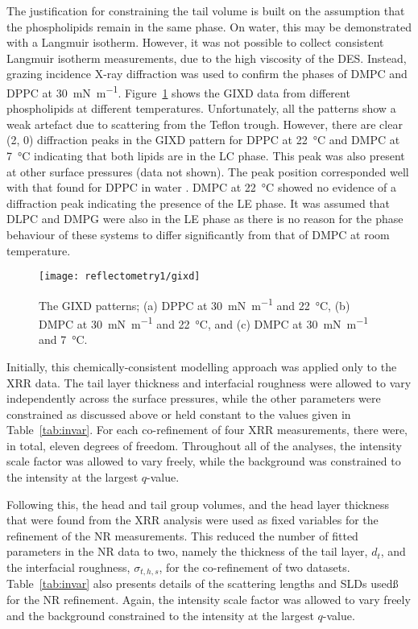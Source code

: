 The justification for constraining the tail volume is built on the assumption that the phospholipids remain in the same phase.
On water, this may be demonstrated with a Langmuir isotherm.
However, it was not possible to collect consistent Langmuir isotherm measurements, due to the high viscosity of the DES.
Instead, grazing incidence X-ray diffraction was used to confirm the phases of DMPC and DPPC at \SI{30}{\milli\newton\per\meter}.
Figure~\ref{fig:gixd} shows the GIXD data from different phospholipids at different temperatures.
Unfortunately, all the patterns show a weak artefact due to scattering from the Teflon trough.
However, there are clear (2, 0) diffraction peaks in the GIXD pattern for DPPC at \SI{22}{\celsius} and DMPC at \SI{7}{\celsius} indicating that both lipids are in the LC phase.
This peak was also present at other surface pressures (data not shown).
The peak position corresponded well with that found for DPPC in water \cite{watkins_structure_2009}.
DMPC at \SI{22}{\celsius} showed no evidence of a diffraction peak indicating the presence of the LE phase.
It was assumed that DLPC and DMPG were also in the LE phase as there is no reason for the phase behaviour of these systems to differ significantly from that of DMPC at room temperature.
%
\begin{figure}
    \centering
    \texttt{[image: reflectometry1/gixd]}
    \caption{The GIXD patterns; (a) DPPC at \SI{30}{\milli\newton\per\meter} and \SI{22}{\celsius}, (b) DMPC at \SI{30}{\milli\newton\per\meter} and \SI{22}{\celsius}, and (c) DMPC at \SI{30}{\milli\newton\per\meter} and \SI{7}{\celsius}.}
    \label{fig:gixd}
\end{figure}
%

Initially, this chemically-consistent modelling approach was applied only to the XRR data.
The tail layer thickness and interfacial roughness were allowed to vary independently across the surface pressures, while the other parameters were constrained as discussed above or held constant to the values given in Table~\ref{tab:invar}.
For each co-refinement of four XRR measurements, there were, in total, eleven degrees of freedom.
Throughout all of the analyses, the intensity scale factor was allowed to vary freely, while the background was constrained to the intensity at the largest $q$-value.

Following this, the head and tail group volumes, and the head layer thickness that were found from the XRR analysis were used as fixed variables for the refinement of the NR measurements.
This reduced the number of fitted parameters in the NR data to two, namely the thickness of the tail layer, $d_t$, and the interfacial roughness, $\sigma_{t,h,s}$, for the co-refinement of two datasets.
Table~\ref{tab:invar} also presents details of the scattering lengths and SLDs usedß for the NR refinement.
Again, the intensity scale factor was allowed to vary freely and the background constrained to the intensity at the largest $q$-value.

